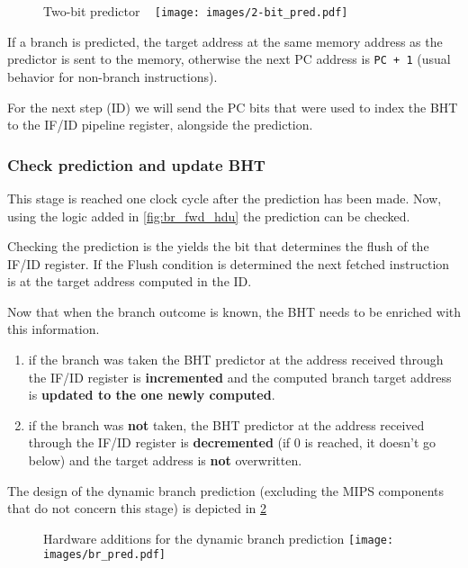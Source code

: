 \documentclass[a4paper,12pt]{report}
\begin{document}
\begin{figure}
\begin{my-figure}{Two-bit predictor ~\cite{patterson2014computer}}
    \centering
    \texttt{[image: images/2-bit\_pred.pdf]}
    \label{fig:predictor_fsm}
\end{my-figure}
\end{figure}
If a branch is predicted, the target address at the same memory address as the predictor is sent to the memory, otherwise the next PC address is \verb|PC + 1| (usual behavior for non-branch instructions).

For the next step (ID) we will send the PC bits that were used to index the BHT to the IF/ID pipeline register, alongside the prediction.

\subsubsection{Check prediction and update BHT}
This stage is reached one clock cycle after the prediction has been made. Now, using the logic added in \ref{fig:br_fwd_hdu} the prediction can be checked.

Checking the prediction is the yields the bit that determines the flush of the IF/ID register. If the Flush condition is determined the next fetched instruction is at the target address computed in the ID.

Now that when the branch outcome is known, the BHT needs to be enriched with this information.
\begin{enumerate}
    \item if the branch was taken the BHT predictor at the address received through the IF/ID register is \textbf{incremented} and the computed branch target address is \textbf{updated to the one newly computed}.
    \item if the branch was \textbf{not} taken, the BHT predictor at the address received through the IF/ID register is \textbf{decremented} (if 0 is reached, it doesn't go below) and the target address is \textbf{not} overwritten.
\end{enumerate}

The design of the dynamic branch prediction (excluding the MIPS components that do not concern this stage) is depicted in \ref{fig:br_pred}

\begin{figure}
    \begin{my-figure}{Hardware additions for the dynamic branch prediction}
        \centering
        \texttt{[image: images/br\_pred.pdf]}
        \label{fig:br_pred}
    \end{my-figure}
\end{figure}
\end{document}
